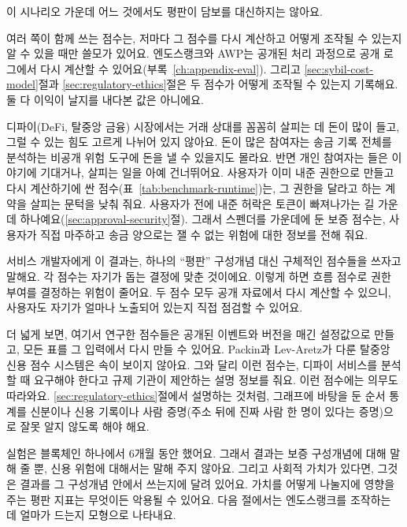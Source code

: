 이 시나리오 가운데 어느 것에서도 평판이 담보를 대신하지는 않아요.


여러 쪽이 함께 쓰는 점수는, 저마다 그 점수를 다시 계산하고 어떻게 조작될 수 있는지 알 수 있을 때만 쓸모가 있어요. 엔도스랭크와 AWP는 공개된 처리 과정으로 공개 로그에서 다시 계산할 수 있어요(부록~\ref{ch:appendix-eval}). 그리고 \ref{sec:sybil-cost-model}절과 \ref{sec:regulatory-ethics}절은 두 점수가 어떻게 조작될 수 있는지 기록해요. 둘 다 이익이 날지를 내다본 값은 아니에요.


디파이(DeFi, 탈중앙 금융) 시장에서는 거래 상대를 꼼꼼히 살피는 데 돈이 많이 들고, 그럴 수 있는 힘도 고르게 나뉘어 있지 않아요. 돈이 많은 참여자는 송금 기록 전체를 분석하는 비공개 위험 도구에 돈을 낼 수 있을지도 몰라요. 반면 개인 참여자는 들은 이야기에 기대거나, 살피는 일을 아예 건너뛰어요. 사용자가 이미 내준 권한으로 만들고 다시 계산하기에 싼 점수(표~\ref{tab:benchmark-runtime})는, 그 권한을 달라고 하는 계약을 살피는 문턱을 낮춰 줘요. 사용자가 전에 내준 허락은 토큰이 빠져나가는 길 가운데 하나예요(\ref{sec:approval-security}절). 그래서 스펜더를 가운데에 둔 보증 점수는, 사용자가 직접 마주하고 송금 양으로는 잴 수 없는 위험에 대한 정보를 전해 줘요.

서비스 개발자에게 이 결과는, 하나의 “평판” 구성개념 대신 구체적인 점수들을 쓰자고 말해요. 각 점수는 자기가 돕는 결정에 맞춘 것이에요. 이렇게 하면 흐름 점수로 권한 부여를 결정하는 위험이 줄어요. 두 점수 모두 공개 자료에서 다시 계산할 수 있으니, 사용자도 자기가 얼마나 노출되어 있는지 직접 점검할 수 있어요.

더 넓게 보면, 여기서 연구한 점수들은 공개된 이벤트와 버전을 매긴 설정값으로 만들고, 모든 표를 그 입력에서 다시 만들 수 있어요. Packin과 Lev-Aretz가 다룬 탈중앙 신용 점수 시스템은 속이 보이지 않아요. 그와 달리 이런 점수는, 디파이 서비스를 분석할 때 요구해야 한다고 규제 기관이 제안하는 설명 정보를 줘요. 이런 점수에는 의무도 따라와요. \ref{sec:regulatory-ethics}절에서 설명하는 것처럼, 그래프에 바탕을 둔 순서 통계를 신분이나 신용 기록이나 사람 증명(주소 뒤에 진짜 사람 한 명이 있다는 증명)으로 잘못 알지 않도록 해야 해요.

실험은 블록체인 하나에서 6개월 동안 했어요. 그래서 결과는 보증 구성개념에 대해 말해 줄 뿐, 신용 위험에 대해서는 말해 주지 않아요. 그리고 사회적 가치가 있다면, 그것은 결과를 그 구성개념 안에서 쓰는지에 달려 있어요. 가치를 어떻게 나눌지에 영향을 주는 평판 지표는 무엇이든 악용될 수 있어요. 다음 절에서는 엔도스랭크를 조작하는 데 얼마가 드는지 모형으로 나타내요.

